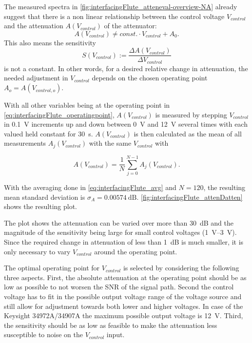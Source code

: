 The measured spectra in \autoref{fig:interfacingFlute_atteneval-overview-NA} already suggest that there is a non linear relationship between the control voltage $V_{control}$ and the attenuation $A(V_{control})$ of the attenuator:
\begin{equation}
A(V_{control}) \neq const. \cdot V_{control} + A_0.
\end{equation}
This also means the sensitivity
\begin{equation}
S(V_{control}) := \frac{\Delta A(V_{control})}{\Delta V_{control}}
\end{equation}
is not a constant.
In other words, for a desired relative change in attenuation, the needed adjustment in $V_{control}$ depends on the chosen operating point $A_o=A(V_{control,o})$.

With all other variables being at the operating point in \autoref{eq:interfacingFlute_operatingpoint}, $A(V_{control})$ is measured by stepping $V_{control}$ in \SI{0.1}{\volt} increments up and down between \SI{0}{\volt} and \SI{12}{\volt} several times with each valued held constant for \SI{30}{\second}. $A(V_{control})$ is then calculated as the mean of all measurements $A_j(V_{control})$ with the same $V_{control}$ with

\begin{equation}\label{eq:interfacingFlute_avg}
A(V_{control}) = \frac{1}{N} \sum_{j=0}^{N-1} A_j(V_{control}).
\end{equation}

With the averaging done in \autoref{eq:interfacingFlute_avg} and $N=120$, the resulting mean standard deviation is $\sigma_A=\SI{0.00574}{\dB}$.
\autoref{fig:interfacingFlute_attenDatten} shows the resulting plot.

The plot shows the attenuation can be varied over more than \SI{30}{\dB} and the magnitude of the sensitivity being large for small control voltages (\SIrange{1}{3}{\volt}).
Since the required change in attenuation of less than \SI{1}{\dB} is much smaller, it is only necessary to vary $V_{control}$ around the operating point.

The optimal operating point for $V_{control}$ is selected by considering the following three aspects.
First, the absolute attenuation at the operating point should be as low as possible to not worsen the SNR of the signal path. Second the control voltage has to fit in the possible output voltage range of the voltage source and still allow for adjustment towards both lower and higher voltages. 
In case of the Keysight 34972A/34907A the maximum possible output voltage is \SI{12}{\volt}.
Third, the sensitivity should be as low as feasible to make the attenuation less susceptible to noise on the $V_{control}$ input.


